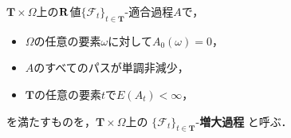 	\begin{screen}
		\begin{dfn}[増大過程]
			$\mathbf{T} \times \Omega$上の$\mathbf{R}$値$\{\mathscr{F}_t\}_{t \in \mathbf{T}}$-適合過程$A$で，
			\begin{itemize}
				\item $\Omega$の任意の要素$\omega$に対して$A_0(\omega) = 0$，
				\item $A$のすべてのパスが単調非減少，
				\item $\mathbf{T}$の任意の要素$t$で$E(A_t) < \infty$，
			\end{itemize}
			を満たすものを，$\mathbf{T} \times \Omega$上の
			$\{\mathscr{F}_t\}_{t \in \mathbf{T}}$-{\bf 増大過程}
			と呼ぶ．
		\end{dfn}
	\end{screen}
	
